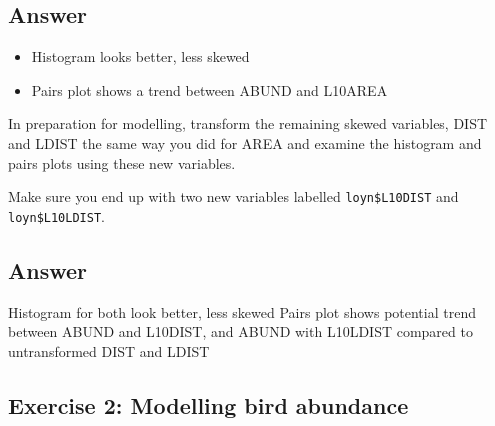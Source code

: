 \documentclass[
  10pt,
  letterpaper,
  DIV=11,
  numbers=noendperiod]{scrartcl}
\newenvironment{Shaded}{\begin{snugshade}}{\end{snugshade}}
\newcommand{\FunctionTok}[1]{\textcolor[rgb]{0.28,0.35,0.67}{#1}}
\newcommand{\NormalTok}[1]{\textcolor[rgb]{0.00,0.23,0.31}{#1}}
\newcommand{\SpecialCharTok}[1]{\textcolor[rgb]{0.37,0.37,0.37}{#1}}
\providecommand{\tightlist}{%
  \setlength{\itemsep}{0pt}\setlength{\parskip}{0pt}}\usepackage{longtable,booktabs,array}
\begin{document}
\begin{Shaded}
\end{Shaded}

\hypertarget{answer-4}{%
\subsection{Answer}\label{answer-4}}

\begin{itemize}
\tightlist
\item
  Histogram looks better, less skewed
\item
  Pairs plot shows a trend between ABUND and L10AREA
\end{itemize}

\begin{tcolorbox}[enhanced jigsaw, rightrule=.15mm, coltitle=black, leftrule=.75mm, titlerule=0mm, breakable, toprule=.15mm, bottomtitle=1mm, colback=white, toptitle=1mm, opacitybacktitle=0.6, bottomrule=.15mm, arc=.35mm, left=2mm, title=\textcolor{quarto-callout-warning-color}{\faExclamationTriangle}\hspace{0.5em}{Question 6}, colbacktitle=quarto-callout-warning-color!10!white, opacityback=0, colframe=quarto-callout-warning-color-frame]

In preparation for modelling, transform the remaining skewed variables,
DIST and LDIST the same way you did for AREA and examine the histogram
and pairs plots using these new variables.

\end{tcolorbox}

Make sure you end up with two new variables labelled
\texttt{loyn\$L10DIST} and \texttt{loyn\$L10LDIST}.

\hypertarget{answer-5}{%
\subsection{Answer}\label{answer-5}}

Histogram for both look better, less skewed Pairs plot shows potential
trend between ABUND and L10DIST, and ABUND with L10LDIST compared to
untransformed DIST and LDIST

\hypertarget{exercise-2-modelling-bird-abundance}{%
\subsection{Exercise 2: Modelling bird
abundance}\label{exercise-2-modelling-bird-abundance}}
\end{document}
